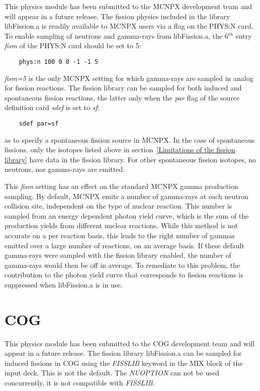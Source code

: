 \documentclass[fleqn,11pt]{article}
\begin{document}
This physics module has been submitted to the MCNPX development team and
will appear in a future release.  The fission physics included in
the library libFission.a is readily available to MCNPX users via a
flag on the PHYS:N card. To enable sampling of neutrons and gamma-rays
from libFission.a, the 6$^{th}$ entry \textit{fism} of the PHYS:N card
should be set to 5:
\begin{verbatim}
	phys:n 100 0 0 -1 -1 5
\end{verbatim}
\textit{fism=5} is the only MCNPX setting for which gamma-rays 
are sampled in analog for fission reactions. The fission library 
can be sampled for both induced and spontaneous fission reactions, 
the latter only when the \textit{par} flag of the source 
definition card \textit{sdef} is set to \textit{sf}:
\begin{verbatim}
	sdef par=sf
\end{verbatim}
as to specify a spontaneous fission source in MCNPX.
In the case of spontaneous fissions, only the isotopes listed 
above in section~\ref{Limitations of the fission library}
have data in the fission library. For other spontaneous
fission isotopes, no neutrons, nor gamma-rays are emitted.

This \textit{fism} setting has an effect on the standard MCNPX 
gamma production sampling. By default, MCNPX emits a number of 
gamma-rays at each neutron collision site, independent on the
type of nuclear reaction. This number is sampled from an energy
dependent photon yield curve, which is the sum of the production 
yields from different nuclear reactions. While this method is not 
accurate on a per reaction basis, this leads to the right number 
of gammas emitted over a large number of reactions, on an average 
basis. If these default gamma-rays were sampled with the fission
library enabled, the number of gamma-rays would then be off 
in average. To remediate to this problem, the contribution to the
photon yield curve that corresponds to fission reactions is 
suppressed when libFission.a is in use.

\pagebreak
\section{COG}
This physics module has been submitted to the COG development team
and will appear in a future release.  The fission library libFission.a
can be sampled for induced fissions in COG using the \textit{FISSLIB}
keyword in the MIX block of the input deck. This is not the
default. The \textit{NUOPTION} can not be used concurrently, it is not
compatible with \textit{FISSLIB}.
\end{document}
